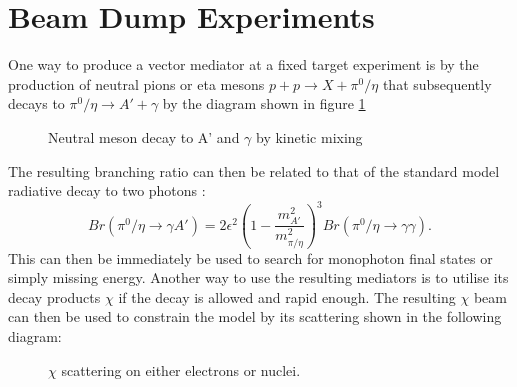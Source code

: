 \section{Beam Dump Experiments}
One way to produce a vector mediator at a fixed target experiment is by the production of neutral pions or eta mesons  $p+p\rightarrow X+\pi^0/\eta$ that subsequently decays to $\pi^0/\eta\rightarrow A' + \gamma$ by the diagram shown in figure \ref{fg:BeamDumpPion}
\begin{figure}[H]
\centering
{}
\caption{Neutral meson decay to A' and $\gamma$ by kinetic mixing}
\label{fg:BeamDumpPion}
\end{figure}
The resulting branching ratio can then be related to that of the standard model radiative decay to two photons \cite{deNiverville:2011it}:
\begin{equation}
Br(\pi^0/\eta \rightarrow \gamma A')= 2\epsilon^2\left(1-\frac{m_{A'}^2}{m_{\pi/\eta}^2}\right)^3 Br(\pi^0/\eta \rightarrow \gamma\gamma)  .
\end{equation}
This can then be immediately be used to search for monophoton final states or simply missing energy.
Another way to use the resulting mediators is to utilise its decay products $\chi$ if the decay is allowed and rapid enough. The resulting $\chi$ beam can then be used to constrain the model by its scattering shown in the following diagram:
\begin{figure}[H]
\centering
{}
\caption{$\chi$ scattering on either electrons or nuclei.}
\label{fg:ChiScattering}
\end{figure}
